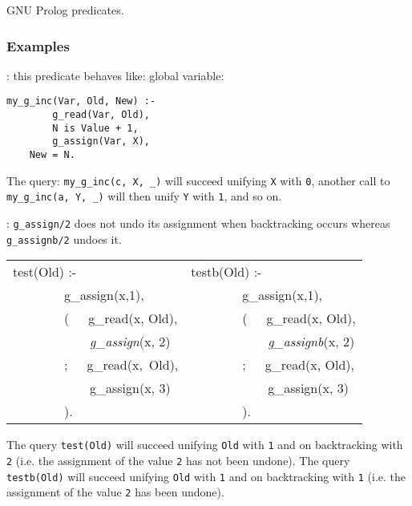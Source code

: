 \Portability

GNU Prolog predicates.

\subsubsection{Examples}
\label{Examples}

: this predicate behaves like:
global variable:

\begin{Indentation}
\begin{verbatim}
my_g_inc(Var, Old, New) :-
        g_read(Var, Old),
        N is Value + 1,
        g_assign(Var, X),
	New = N.
\end{verbatim}
\end{Indentation}

The query: \texttt{my\_g\_inc(c, X, \_)} will succeed unifying \texttt{X} with
\texttt{0}, another call to \texttt{my\_g\_inc(a, Y, \_)} will then unify
\texttt{Y} with \texttt{1}, and so on.

:
\texttt{g\_assign/2} does not undo its assignment when backtracking occurs
whereas \texttt{g\_assignb/2} undoes it.

\begin{Code}
\begin{tabular}{@{}p{6cm}@{\quad}l@{}}
test(Old) :-                 & testb(Old) :- \\
~~~~~~~~g\_assign(x,1),      & ~~~~~~~~g\_assign(x,1), \\
~~~~~~~~(~~~g\_read(x, Old), & ~~~~~~~~(~~~g\_read(x, Old), \\
~~~~~~~~~~~~\textit{g\_assign}(x, 2)  & ~~~~~~~~~~~~\textit{g\_assignb}(x, 2) \\
~~~~~~~~;~~~g\_read(x,~Old), & ~~~~~~~~;~~~g\_read(x, Old), \\
~~~~~~~~~~~~g\_assign(x, 3)  & ~~~~~~~~~~~~g\_assign(x, 3) \\
~~~~~~~~).                   & ~~~~~~~~).                  \\
\end{tabular}
\end{Code}

The query \texttt{test(Old)} will succeed unifying \texttt{Old} with
\texttt{1} and on backtracking with \texttt{2} (i.e. the assignment of the
value \texttt{2} has not been undone). The query \texttt{testb(Old)} will
succeed unifying \texttt{Old} with \texttt{1} and on backtracking with
\texttt{1} (i.e. the assignment of the value \texttt{2} has been undone).

